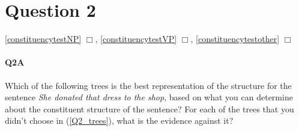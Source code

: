 \documentclass{article}
\begin{document}
\section*{Question 2}
\hfill{}
\ref{constituencytestNP} $\Box$,
\ref{constituencytestVP} $\Box$,
\ref{constituencytestother} $\Box$

\paragraph{Q2A} Which of the following trees is the best representation of the structure for the sentence \emph{She donated that dress to the shop}, based on what you can determine about the constituent
structure of the sentence? For each of the trees that you didn’t choose in (\ref{Q2_trees}), what is the evidence against it?
\begin{exe}
    \label{Q2_trees}
\end{exe}
\end{document}
